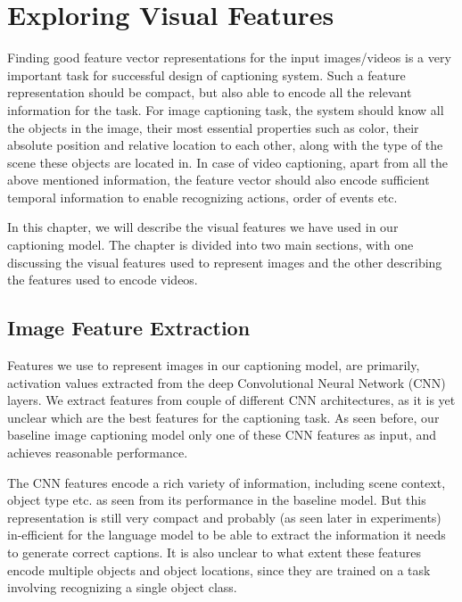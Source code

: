 \chapter{Exploring Visual Features}
\label{chapter:VisFeatChapter}

Finding good feature vector representations for the input images/videos is a
very important task for successful design of captioning system.
Such a feature representation should be compact, but also able to encode all the
relevant information for the task. 
For image captioning task, the system should know all the objects in the image,
their most essential properties such as color, their absolute position and
relative location to each other, along with the type of the scene these objects
are located in.
In case of video captioning, apart from all the above mentioned information, the
feature vector should also encode sufficient temporal information to enable
recognizing actions, order of events etc.

In this chapter, we will describe the visual features we have used in
our captioning model.
The chapter is divided into two main sections, with one discussing the visual
features used to represent images and the other describing the features used to
encode videos.

\section{Image Feature Extraction}
\label{sec:ImageFeat}

Features we use to represent images in our captioning model, are primarily,
activation values extracted from the deep Convolutional Neural Network (CNN)
layers.
We extract features from couple of different CNN architectures, as it is yet
unclear which are the best features for the captioning task.
As seen before, our baseline image captioning model only one of these CNN
features as input, and achieves reasonable performance.


The CNN features encode a rich variety of information, including scene context,
object type etc. as seen from its performance in the baseline model.
But this representation is still very compact and probably (as seen later in
experiments) in-efficient for the language model to be able to extract the
information it needs to generate correct captions.
It is also unclear to what extent these features encode multiple objects and
object locations, since they are trained on a task involving recognizing a
single object class.

